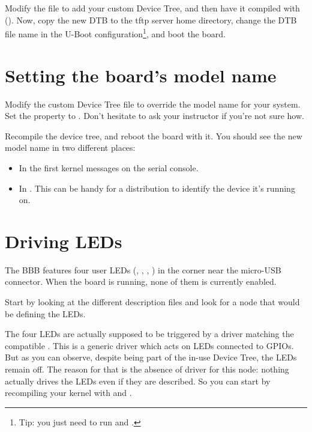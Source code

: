 Modify the  file to add your custom
Device Tree, and then have it compiled with (). Now,
copy the new DTB to the tftp server home directory, change the DTB file
name in the U-Boot configuration\footnote{Tip: you just need to run
 and .}, and boot the board.

\section{Setting the board's model name}

Modify the custom Device Tree file to override the model name for your
system. Set the  property to . Don't hesitate to ask your instructor if you're not sure how.

Recompile the device tree, and reboot the board with it. You should see
the new model name in two different places:

\begin{itemize}
\item In the first kernel messages on the serial console.
\item In . This can be
      handy for a distribution to identify the device it's running on.
\end{itemize}

\section{Driving LEDs}

The BBB features four user LEDs (, , ,
) in the corner near the micro-USB connector. When the board
is running, none of them is currently enabled.

Start by looking at the different description files and look for a node
that would be defining the LEDs.

The four LEDs are actually supposed to be triggered by a driver matching
the compatible . This is a generic driver which acts on
LEDs connected to GPIOs. But as you can observe, despite being part of
the in-use Device Tree, the LEDs remain off. The reason for that is the
absence of driver for this node: nothing actually drives the LEDs even
if they are described. So you can start by recompiling your kernel with
 and .

